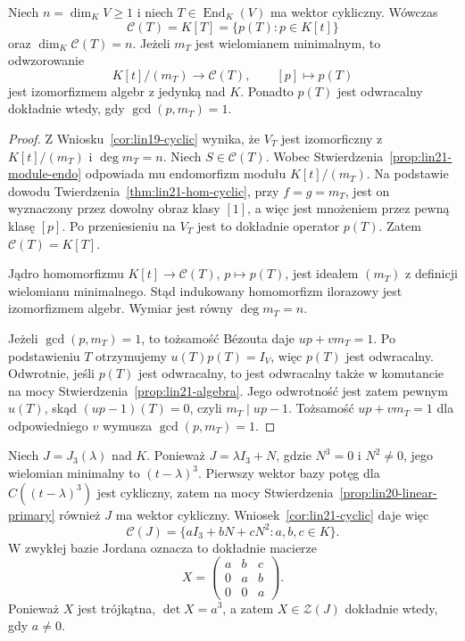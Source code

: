 \begin{wniosek}
\label{cor:lin21-cyclic}
Niech \(n=\dim_K V\ge1\) i
niech \(T\in\operatorname{End}_K(V)\)
ma wektor cykliczny.
Wówczas
\[
 \mathcal C(T)=K[T]
 =\{p(T):p\in K[t]\}
\]
oraz \(\dim_K\mathcal C(T)=n\).
Jeżeli \(m_T\) jest wielomianem
minimalnym, to odwzorowanie
\[
 K[t]/(m_T)\longrightarrow\mathcal C(T),
 \qquad [p]\longmapsto p(T)
\]
jest izomorfizmem algebr
z jedynką nad \(K\).
Ponadto \(p(T)\) jest odwracalny
dokładnie wtedy, gdy
\(\gcd(p,m_T)=1\).
\end{wniosek}
\begin{proof}
Z Wniosku~\ref{cor:lin19-cyclic}
wynika, że \(V_T\) jest
izomorficzny z \(K[t]/(m_T)\)
i \(\deg m_T=n\).
Niech \(S\in\mathcal C(T)\).
Wobec
Stwierdzenia~\ref{prop:lin21-module-endo}
odpowiada mu endomorfizm modułu
\(K[t]/(m_T)\).
Na podstawie dowodu
Twierdzenia~\ref{thm:lin21-hom-cyclic},
przy \(f=g=m_T\), jest on wyznaczony
przez dowolny obraz klasy \([1]\),
a więc jest mnożeniem przez pewną
klasę \([p]\).
Po przeniesieniu na \(V_T\)
jest to dokładnie operator \(p(T)\).
Zatem \(\mathcal C(T)=K[T]\).

Jądro homomorfizmu
\(K[t]\to\mathcal C(T)\),
\(p\mapsto p(T)\), jest ideałem
\((m_T)\) z definicji
wielomianu minimalnego.
Stąd indukowany homomorfizm
ilorazowy jest izomorfizmem algebr.
Wymiar jest równy
\(\deg m_T=n\).

Jeżeli \(\gcd(p,m_T)=1\),
to tożsamość Bézouta daje
\(up+vm_T=1\).
Po podstawieniu \(T\)
otrzymujemy \(u(T)p(T)=I_V\),
więc \(p(T)\) jest odwracalny.
Odwrotnie, jeśli \(p(T)\)
jest odwracalny, to jest
odwracalny także w komutancie
na mocy Stwierdzenia~\ref{prop:lin21-algebra}.
Jego odwrotność jest zatem
pewnym \(u(T)\), skąd
\((up-1)(T)=0\), czyli
\(m_T\mid up-1\).
Tożsamość \(up+vm_T=1\)
dla odpowiedniego \(v\)
wymusza \(\gcd(p,m_T)=1\).
\end{proof}

\begin{przyklad}
\label{prz:lin21-jordan}
Niech \(J=J_3(\lambda)\) nad \(K\).
Ponieważ \(J=\lambda I_3+N\), gdzie
\(N^3=0\) i \(N^2\ne0\),
jego wielomian minimalny to
\((t-\lambda)^3\).
Pierwszy wektor bazy potęg
dla \(C((t-\lambda)^3)\)
jest cykliczny, zatem na mocy
Stwierdzenia~\ref{prop:lin20-linear-primary}
również \(J\) ma wektor cykliczny.
Wniosek~\ref{cor:lin21-cyclic}
daje więc
\[
 \mathcal C(J)
 =\{aI_3+bN+cN^2:a,b,c\in K\}.
\]
W zwykłej bazie Jordana oznacza to
dokładnie macierze
\[
 X=\begin{pmatrix}
 a&b&c\\0&a&b\\0&0&a
 \end{pmatrix}.
\]
Ponieważ \(X\) jest trójkątna,
\(\det X=a^3\), a zatem
\(X\in\mathcal Z(J)\) dokładnie
wtedy, gdy \(a\ne0\).
\end{przyklad}

